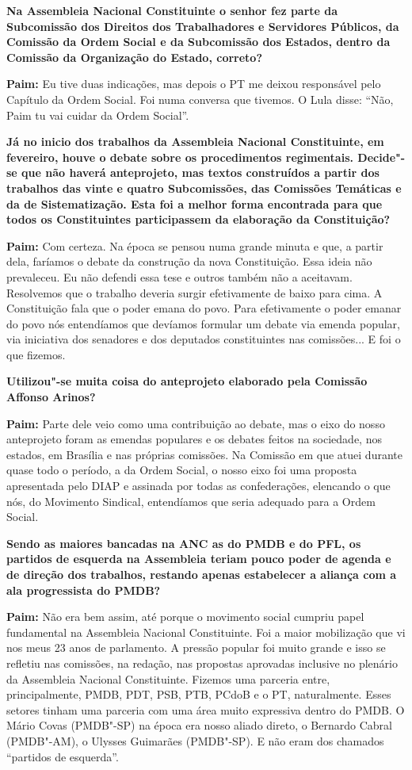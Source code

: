 \textbf{Na Assembleia Nacional Constituinte o senhor fez parte da
Subcomissão dos Direitos dos Trabalhadores e Servidores Públicos, da
Comissão da Ordem Social e da Subcomissão dos Estados, dentro da
Comissão da Organização do Estado, correto?}

\textbf{Paim:} Eu tive duas indicações, mas depois o PT me deixou
responsável pelo Capítulo da Ordem Social. Foi numa conversa que
tivemos. O Lula disse: ``Não, Paim tu vai cuidar da Ordem Social''.

\textbf{Já no inicio dos trabalhos da Assembleia Nacional Constituinte,
em fevereiro, houve o debate sobre os procedimentos regimentais.
Decide"-se que não haverá anteprojeto, mas textos construídos a partir
dos trabalhos das vinte e quatro Subcomissões, das Comissões Temáticas e
da de Sistematização. Esta foi a melhor forma encontrada para que todos
os Constituintes participassem da elaboração da Constituição?}

\textbf{Paim:} Com certeza. Na época se pensou numa grande minuta e que,
a partir dela, faríamos o debate da construção da nova Constituição.
Essa ideia não prevaleceu. Eu não defendi essa tese e outros também não
a aceitavam. Resolvemos que o trabalho deveria surgir efetivamente de
baixo para cima. A Constituição fala que o poder emana do povo. Para
efetivamente o poder emanar do povo nós entendíamos que devíamos
formular um debate via emenda popular, via iniciativa dos senadores e
dos deputados constituintes nas comissões... E foi o que fizemos.

\textbf{Utilizou"-se muita coisa do anteprojeto elaborado pela Comissão
Affonso Arinos?}

\textbf{Paim:} Parte dele veio como uma contribuição ao debate, mas o
eixo do nosso anteprojeto foram as emendas populares e os debates feitos
na sociedade, nos estados, em Brasília e nas próprias comissões. Na
Comissão em que atuei durante quase todo o período, a da Ordem Social, o
nosso eixo foi uma proposta apresentada pelo DIAP e assinada por todas
as confederações, elencando o que nós, do Movimento Sindical,
entendíamos que seria adequado para a Ordem Social.

\textbf{Sendo as maiores bancadas na ANC as do PMDB e do PFL, os
partidos de esquerda na Assembleia teriam pouco poder de agenda e de
direção dos trabalhos, restando apenas estabelecer a aliança com a ala
progressista do PMDB? }

\textbf{Paim:} Não era bem assim, até porque o movimento social cumpriu
papel fundamental na Assembleia Nacional Constituinte. Foi a maior
mobilização que vi nos meus 23 anos de parlamento. A pressão popular foi
muito grande e isso se refletiu nas comissões, na redação, nas propostas
aprovadas inclusive no plenário da Assembleia Nacional Constituinte.
Fizemos uma parceria entre, principalmente, PMDB, PDT, PSB, PTB, PCdoB e
o PT, naturalmente. Esses setores tinham uma parceria com uma área muito
expressiva dentro do PMDB. O Mário Covas (PMDB"-SP) na época era nosso
aliado direto, o Bernardo Cabral (PMDB"-AM), o Ulysses Guimarães
(PMDB"-SP). E não eram dos chamados ``partidos de esquerda''.

